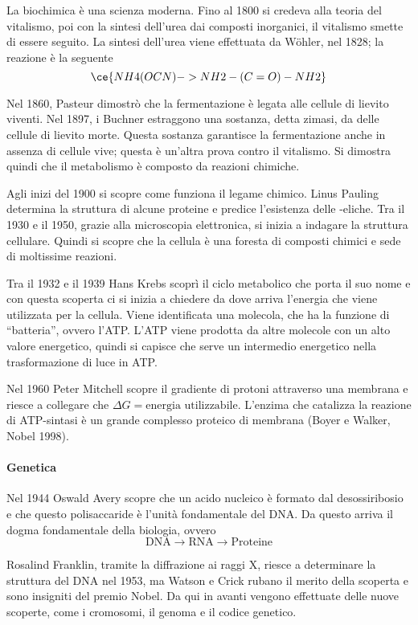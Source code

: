 La biochimica è una scienza moderna. Fino al 1800 si credeva alla teoria
del vitalismo, poi con la sintesi dell'urea dai composti inorganici, il
vitalismo smette di essere seguito. La sintesi dell'urea viene
effettuata da W\"ohler, nel 1828; la reazione è la seguente
\[
\ce{NH4(OCN) -> NH2-(C=O)-NH2}
\]

Nel 1860, Pasteur dimostrò che la fermentazione è legata alle cellule di
lievito viventi. Nel 1897, i Buchner estraggono una sostanza, detta
zimasi, da delle cellule di lievito morte. Questa sostanza garantisce la
fermentazione anche in assenza di cellule vive; questa è un'altra prova
contro il vitalismo. Si dimostra quindi che il metabolismo è composto da
reazioni chimiche.

Agli inizi del 1900 si scopre come funziona il legame chimico. Linus
Pauling determina la struttura di alcune proteine e predice l'esistenza
delle \alpha-eliche. Tra il 1930 e il 1950, grazie alla microscopia
elettronica, si inizia a indagare la struttura cellulare. Quindi si
scopre che la cellula è una foresta di composti chimici e sede di
moltissime reazioni.

Tra il 1932 e il 1939 Hans Krebs scoprì il ciclo metabolico che porta il
suo nome e con questa scoperta ci si inizia a chiedere da dove arriva
l'energia che viene utilizzata per la cellula. Viene identificata una
molecola, che ha la funzione di ``batteria'', ovvero l'ATP. L'ATP viene
prodotta da altre molecole con un alto valore energetico, quindi si
capisce che serve un intermedio energetico nella trasformazione di luce
in ATP.

Nel 1960 Peter Mitchell scopre il gradiente di protoni attraverso una
membrana e riesce a collegare che
\(\Delta G = \text{energia utilizzabile}\). L'enzima che catalizza la
reazione di ATP-sintasi è un grande complesso proteico di membrana
(Boyer e Walker, Nobel 1998).

\paragraph{Genetica}

Nel 1944 Oswald Avery scopre che un acido nucleico è formato dal
desossiribosio e che questo polisaccaride è l'unità fondamentale del
DNA. Da questo arriva il dogma fondamentale della biologia, ovvero
\[
\text{DNA} \rightarrow \text{RNA} \rightarrow \text{Proteine}
\]

Rosalind Franklin, tramite la diffrazione ai raggi X, riesce a
determinare la struttura del DNA nel 1953, ma Watson e Crick rubano il
merito della scoperta e sono insigniti del premio Nobel. Da qui in
avanti vengono effettuate delle nuove scoperte, come i cromosomi, il
genoma e il codice genetico.

